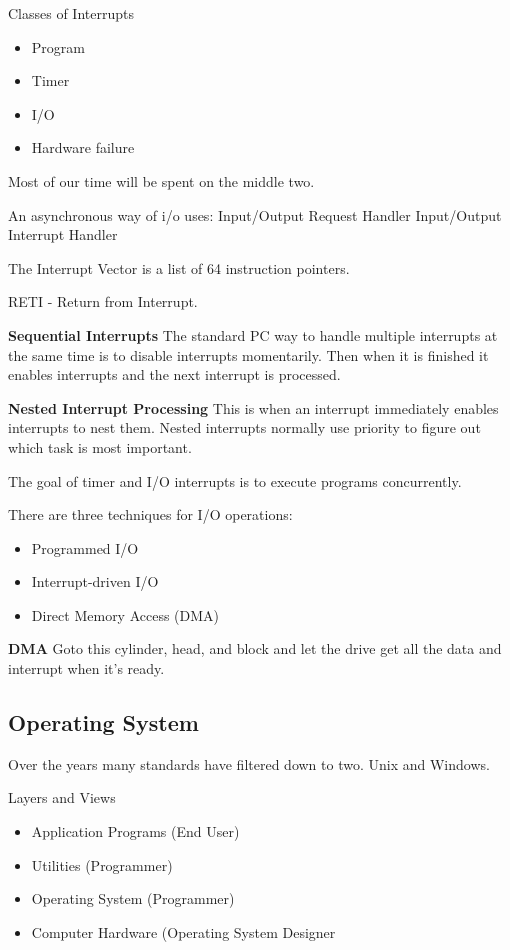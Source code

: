\documentclass{article}
\begin{document}
Classes of Interrupts
\begin{itemize}
\item Program
\item Timer
\item I/O
\item Hardware failure
\end{itemize}

Most of our time will be spent on the middle two. 


An asynchronous way of i/o uses:
Input/Output Request Handler
Input/Output Interrupt Handler

The Interrupt Vector is a list of 64 instruction pointers. 

RETI - Return from Interrupt.

{\bf Sequential Interrupts}
The standard PC way to handle multiple interrupts at the same time is to disable interrupts momentarily. 
Then when it is finished it enables interrupts and the next interrupt is processed. 

{\bf Nested Interrupt Processing}
This is when an interrupt immediately enables interrupts to nest them. 
Nested interrupts normally use priority to figure out which task is most important. 

The goal of timer and I/O interrupts is to execute programs concurrently. 


There are three techniques for I/O operations:
\begin{itemize}
\item Programmed I/O
\item Interrupt-driven I/O
\item Direct Memory Access (DMA)
\end{itemize}

{\bf DMA}
Goto this cylinder, head, and block and let the drive get all the data and interrupt when it's ready. 

\subsection*{Operating System}

Over the years many standards have filtered down to two. Unix and Windows.

Layers and Views
\begin{itemize}
\item Application Programs (End User)
\item Utilities (Programmer)
\item Operating System (Programmer)
\item Computer Hardware (Operating System Designer
\end{itemize}
\end{document}
